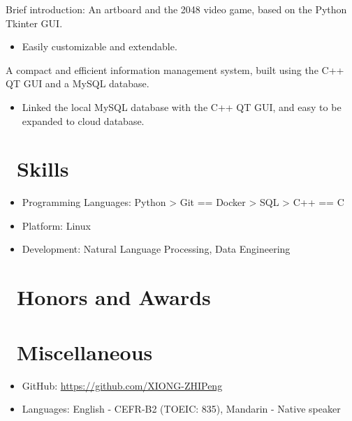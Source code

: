 \documentclass{resume}
\begin{document}
Brief introduction: An artboard and the 2048 video game, based on the Python Tkinter GUI.
\begin{itemize}
  \item Easily customizable and extendable.

\end{itemize}


A compact and efficient information management system, built using the C++ QT GUI and a MySQL database.
\begin{itemize}
  \item Linked the local MySQL database with the C++ QT GUI, and easy to be expanded to cloud database.
\end{itemize}


\section{\faCogs\ Skills}
\begin{itemize}[parsep=0.5ex]
  \item Programming Languages: Python > Git == Docker > SQL > C++ == C
  \item Platform: Linux
  \item Development: Natural Language Processing, Data Engineering
\end{itemize}

\section{\faHeartO\ Honors and Awards}

\section{\faInfo\ Miscellaneous}
\begin{itemize}[parsep=0.5ex]
  \item GitHub: \url{https://github.com/XIONG-ZHIPeng}
  \item Languages: English - CEFR-B2 (TOEIC: 835), Mandarin - Native speaker
\end{itemize}

%
%
\end{document}
